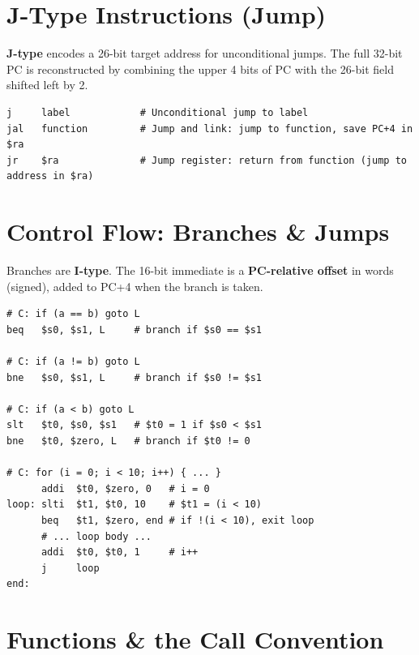 \documentclass[11pt, letterpaper]{article}
\begin{document}
\section*{J-Type Instructions (Jump)}

\textbf{J-type} encodes a 26-bit target address for unconditional jumps. The full 32-bit PC is reconstructed by combining the upper 4 bits of PC with the 26-bit field shifted left by 2.

\begin{lstlisting}[style=mips, caption={J-Type examples}]
j     label            # Unconditional jump to label
jal   function         # Jump and link: jump to function, save PC+4 in $ra
jr    $ra              # Jump register: return from function (jump to address in $ra)
\end{lstlisting}

\section*{Control Flow: Branches \& Jumps}

Branches are \textbf{I-type}. The 16-bit immediate is a \textbf{PC-relative offset} in words (signed), added to PC+4 when the branch is taken.

\begin{lstlisting}[style=mips, caption={Branch examples and C-to-MIPS translation}]
# C: if (a == b) goto L
beq   $s0, $s1, L     # branch if $s0 == $s1

# C: if (a != b) goto L
bne   $s0, $s1, L     # branch if $s0 != $s1

# C: if (a < b) goto L
slt   $t0, $s0, $s1   # $t0 = 1 if $s0 < $s1
bne   $t0, $zero, L   # branch if $t0 != 0

# C: for (i = 0; i < 10; i++) { ... }
      addi  $t0, $zero, 0   # i = 0
loop: slti  $t1, $t0, 10    # $t1 = (i < 10)
      beq   $t1, $zero, end # if !(i < 10), exit loop
      # ... loop body ...
      addi  $t0, $t0, 1     # i++
      j     loop
end:
\end{lstlisting}

\section*{Functions \& the Call Convention}
\end{document}
